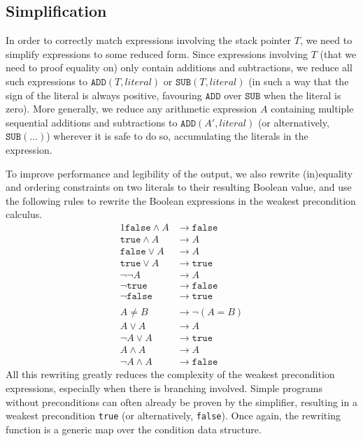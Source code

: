\documentclass[a4paper]{article}
\begin{document}
\subsection{Simplification}
In order to correctly match expressions involving the stack pointer $T$, we need to simplify expressions to some reduced form. Since expressions involving $T$ (that we need to proof equality on) only contain additions and subtractions, we reduce all such expressions to $\mathtt{ADD}(T, \mathit{literal})$ or $\mathtt{SUB}(T, \mathit{literal})$ (in such a way that the sign of the literal is always positive, favouring $\mathtt{ADD}$ over $\mathtt{SUB}$ when the literal is zero). More generally, we reduce any arithmetic expression $A$ containing multiple sequential additions and subtractions to $\mathtt{ADD}(A', \mathit{literal})$ (or alternatively, $\mathtt{SUB}(\ldots)$) wherever it is safe to do so, accumulating the literals in the expression.

To improve performance and legibility of the output, we also rewrite (in)equality and ordering constraints on two literals to their resulting Boolean value, and use the following rules to rewrite the Boolean expressions in the weakest precondition calculus.
\begin{alignat*}{1}
\mathtt{false} \wedge A &\longrightarrow \mathtt{false}\\
\mathtt{true} \wedge A &\longrightarrow A\\
\mathtt{false} \vee A &\longrightarrow A\\
\mathtt{true} \vee A &\longrightarrow \mathtt{true}\\
\neg\neg A &\longrightarrow A\\
\neg\mathtt{true} &\longrightarrow \mathtt{false}\\
\neg\mathtt{false} &\longrightarrow \mathtt{true}\\\\
A \neq B &\longrightarrow \neg(A = B)\\
A \vee A &\longrightarrow A\\
\neg A \vee A &\longrightarrow \mathtt{true}\\
A \wedge A &\longrightarrow A\\
\neg A \wedge A &\longrightarrow \mathtt{false}
\end{alignat*}
All this rewriting greatly reduces the complexity of the weakest precondition expressions, especially when there is branching involved. Simple programs without preconditions can often already be proven by the simplifier, resulting in a weakest precondition \texttt{true} (or alternatively, \texttt{false}). Once again, the rewriting function is a generic map over the condition data structure.
\end{document}
